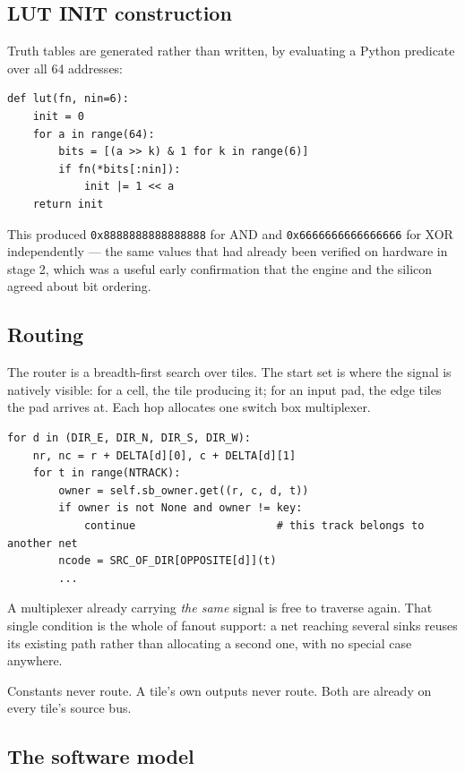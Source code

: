 \documentclass[11pt,a4paper]{article}
\begin{document}
\subsection{LUT INIT construction}

Truth tables are generated rather than written, by evaluating a Python predicate
over all 64 addresses:

\begin{lstlisting}[style=py]
def lut(fn, nin=6):
    init = 0
    for a in range(64):
        bits = [(a >> k) & 1 for k in range(6)]
        if fn(*bits[:nin]):
            init |= 1 << a
    return init
\end{lstlisting}

This produced \texttt{0x8888888888888888} for AND and
\texttt{0x6666666666666666} for XOR independently --- the same values that had
already been verified on hardware in stage 2, which was a useful early
confirmation that the engine and the silicon agreed about bit ordering.

\subsection{Routing}

The router is a breadth-first search over tiles. The start set is where the
signal is natively visible: for a cell, the tile producing it; for an input pad,
the edge tiles the pad arrives at. Each hop allocates one switch box
multiplexer.

\begin{lstlisting}[style=py]
for d in (DIR_E, DIR_N, DIR_S, DIR_W):
    nr, nc = r + DELTA[d][0], c + DELTA[d][1]
    for t in range(NTRACK):
        owner = self.sb_owner.get((r, c, d, t))
        if owner is not None and owner != key:
            continue                      # this track belongs to another net
        ncode = SRC_OF_DIR[OPPOSITE[d]](t)
        ...
\end{lstlisting}

A multiplexer already carrying \emph{the same} signal is free to traverse again.
That single condition is the whole of fanout support: a net reaching several
sinks reuses its existing path rather than allocating a second one, with no
special case anywhere.

Constants never route. A tile's own outputs never route. Both are already on
every tile's source bus.

\subsection{The software model}
\end{document}
